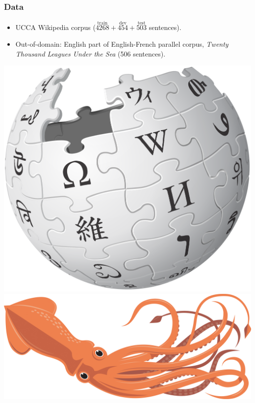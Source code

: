 \documentclass[t,xcolor={svgnames}]{beamer}
\begin{document}
\begin{frame}
\frametitle{Data}
\begin{itemize}
 \item UCCA Wikipedia corpus ($\stackrel{\text{train}}{4268}+\stackrel{\text{dev}}{454}+\stackrel{\text{test}}{503}$ sentences).
 \item Out-of-domain: English part of English-French parallel corpus,
     \textit{Twenty Thousand Leagues Under the Sea} (506 sentences).
\end{itemize}

\vfill
\begin{center}
  \includegraphics[width=.5\linewidth]{wikipedia.png}
  \includegraphics[width=.5\linewidth]{squid.jpg}
\end{center}
\end{frame}
\end{document}
